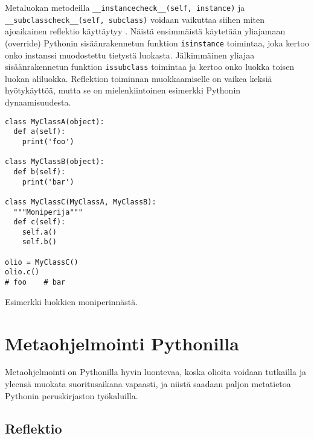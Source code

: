 \documentclass[finnish]{tktltiki2}
\theoremstyle{definition}
\theoremstyle{remark}
\begin{document}
Metaluokan metodeilla \verb|__instancecheck__(self, instance)| ja \\\lstinline|__subclasscheck__(self, subclass)| voidaan vaikuttaa siihen miten ajoaikainen reflektio käyttäytyy \cite{magic-methods, Python-docs}. Näistä ensimmäistä käytetään yliajamaan (override) Pythonin sisäänrakennetun funktion \verb|isinstance| toimintaa, joka kertoo onko instanssi muodostettu tietystä luokasta. Jälkimmäinen yliajaa sisäänrakennetun funktion \verb|issubclass| toimintaa ja kertoo onko luokka toisen luokan aliluokka. Reflektion toiminnan muokkaamiselle on vaikea keksiä hyötykäyttöä, mutta se on mielenkiintoinen esimerkki Pythonin dynaamisuudesta.


\begin{listing}
\begin{verbatim}
class MyClassA(object):
  def a(self):
    print('foo')

class MyClassB(object):
  def b(self):
    print('bar')

class MyClassC(MyClassA, MyClassB):
  """Moniperija"""
  def c(self):
    self.a()
    self.b()

olio = MyClassC()
olio.c()
# foo    # bar
\end{verbatim}
    \caption{Esimerkki luokkien moniperinnästä.}
    \label{lst:ex_moniperinta}
\end{listing}



\section{Metaohjelmointi Pythonilla}


Metaohjelmointi on Pythonilla hyvin luontevaa, koska olioita voidaan tutkailla ja yleensä muokata suoritusaikana vapaasti, ja niistä saadaan paljon metatietoa Pythonin peruskirjaston työkaluilla.


\subsection{Reflektio}


\end{document}
